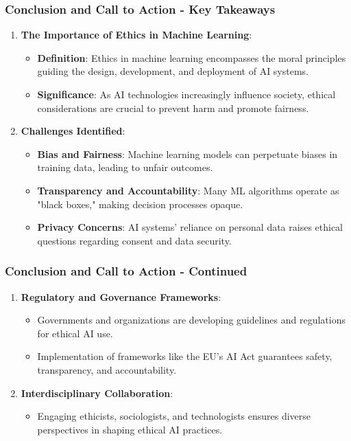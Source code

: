 \documentclass{beamer}
\begin{document}
\begin{frame}[fragile]
    \frametitle{Conclusion and Call to Action - Key Takeaways}
    \begin{enumerate}
        \item \textbf{The Importance of Ethics in Machine Learning}:
        \begin{itemize}
            \item \textbf{Definition}: Ethics in machine learning encompasses the moral principles guiding the design, development, and deployment of AI systems.
            \item \textbf{Significance}: As AI technologies increasingly influence society, ethical considerations are crucial to prevent harm and promote fairness.
        \end{itemize}
        
        \item \textbf{Challenges Identified}:
        \begin{itemize}
            \item \textbf{Bias and Fairness}: Machine learning models can perpetuate biases in training data, leading to unfair outcomes. 
            \item \textbf{Transparency and Accountability}: Many ML algorithms operate as "black boxes," making decision processes opaque.
            \item \textbf{Privacy Concerns}: AI systems' reliance on personal data raises ethical questions regarding consent and data security.
        \end{itemize}
    \end{enumerate}
\end{frame}

\begin{frame}[fragile]
    \frametitle{Conclusion and Call to Action - Continued}
    \begin{enumerate}[start=3]
        \item \textbf{Regulatory and Governance Frameworks}:
        \begin{itemize}
            \item Governments and organizations are developing guidelines and regulations for ethical AI use.
            \item Implementation of frameworks like the EU’s AI Act guarantees safety, transparency, and accountability.
        \end{itemize}
        
        \item \textbf{Interdisciplinary Collaboration}:
        \begin{itemize}
            \item Engaging ethicists, sociologists, and technologists ensures diverse perspectives in shaping ethical AI practices.
        \end{itemize}
    \end{enumerate}
\end{frame}
\end{document}
